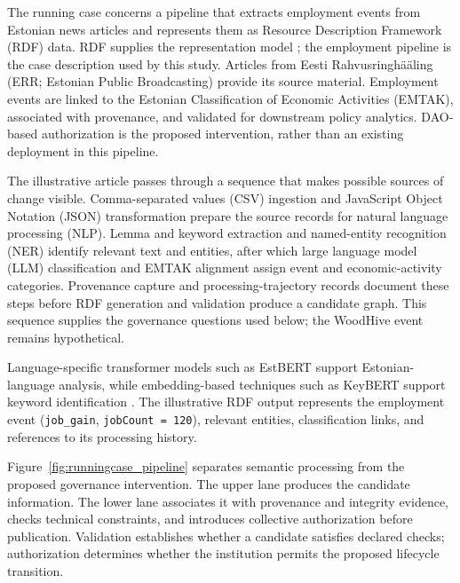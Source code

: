 \documentclass[journal]{IEEEtran}
\begin{document}
The running case concerns a pipeline that extracts employment
events from Estonian news articles and represents them as
Resource Description Framework (RDF) data. RDF supplies the
representation model \cite{Cyganiak2014RDFConcepts}; the
employment pipeline is the case description used by this study.
Articles from Eesti Rahvusringhääling (ERR; Estonian Public
Broadcasting) provide its source material. Employment events
are linked to the Estonian Classification of Economic Activities
(EMTAK), associated with provenance, and validated for downstream
policy analytics. DAO-based authorization is the proposed
intervention, rather than an existing deployment in this pipeline.

The illustrative article passes through a sequence that makes possible
sources of change visible. Comma-separated values (CSV) ingestion and
JavaScript Object Notation (JSON) transformation prepare the source
records for natural language processing (NLP). Lemma and keyword
extraction and named-entity recognition (NER) identify relevant text
and entities, after which large language model (LLM) classification
and EMTAK alignment assign event and economic-activity categories.
Provenance capture and processing-trajectory records document these
steps before RDF generation and validation produce a candidate graph.
This sequence supplies the governance questions used below; the
WoodHive event remains hypothetical.

Language-specific transformer models such as EstBERT support
Estonian-language analysis, while embedding-based techniques
such as KeyBERT support keyword identification
\cite{Tanvir2021EstBERT,Grootendorst2020KeyBERT}.
The illustrative RDF output represents the employment event
(\texttt{job\_gain}, \texttt{jobCount = 120}), relevant entities,
classification links, and references to its processing history.

Figure~\ref{fig:runningcase_pipeline} separates semantic
processing from the proposed governance intervention.
The upper lane produces the candidate information.
The lower lane associates it with provenance and integrity
evidence, checks technical constraints, and introduces
collective authorization before publication. Validation
establishes whether a candidate satisfies declared checks;
authorization determines whether the institution permits
the proposed lifecycle transition.
\end{document}
